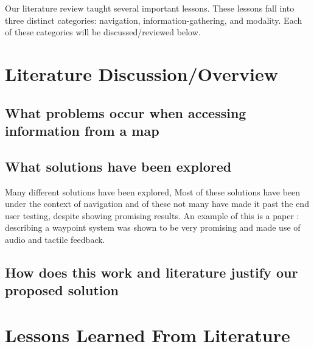 \documentclass{article}
\begin{document}
Our literature review taught several important lessons. These lessons fall into three distinct categories: navigation, information-gathering, and modality. Each of these categories will be discussed/reviewed below. 

\section{Literature Discussion/Overview}

\subsection{What problems occur when accessing information from a map}


\subsection{What solutions have been explored}
Many different solutions have been explored, Most of these solutions have been under the context of navigation and of these not many have made it past the end user testing, despite showing promising results. An example of this is a paper : \cite{} describing a waypoint system was shown to be very promising and made use of audio and tactile feedback. 


\subsection{How does this work and literature justify our proposed solution}

\section{Lessons Learned From Literature}


\end{document}
